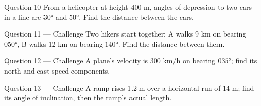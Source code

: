 \documentclass[11pt]{article}
\begin{document}
\begin{qbox}{Question 10}
From a helicopter at height 400 m, angles of depression to two cars in a line are $30°$ and $50°$. Find the distance between the cars.\workspace{2.4cm}
\end{qbox}

\begin{qbox}{Question 11 --- Challenge}
Two hikers start together; A walks 9 km on bearing $050°$, B walks 12 km on bearing $140°$. Find the distance between them.\workspace{3cm}
\end{qbox}

\begin{qbox}{Question 12 --- Challenge}
A plane's velocity is 300 km/h on bearing $035°$; find its north and east speed components.\workspace{3cm}
\end{qbox}

\begin{qbox}{Question 13 --- Challenge}
A ramp rises 1.2 m over a horizontal run of 14 m; find its angle of inclination, then the ramp's actual length.\workspace{3.2cm}
\end{qbox}

\clearpage
{}
\end{document}
